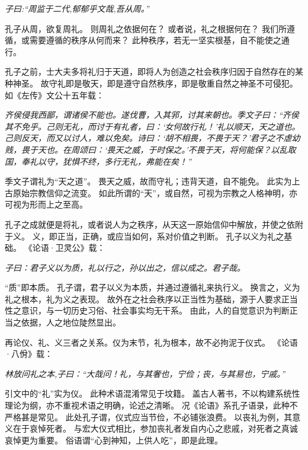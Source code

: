 \documentclass[11pt]{article}
\begin{document}
\textit{子曰:“周监于二代,郁郁乎文哉,吾从周。”}

孔子从周，欲复周礼。
则周礼之依据何在？
或者说，礼之根据何在？
我们所遵循，或需要遵循的秩序从何而来？
此种秩序，若无一坚实根基，自不能使之通行。

\par

孔子之前，士大夫多将礼归于天道，即将人为创造之社会秩序归因于自然存在的某种神圣。
故守礼即是敬天，即是遵守自然秩序，即是敬重自然之神圣不可侵犯。
如《左传》文公十五年载：

\textit{齐侯侵我西鄙，谓诸侯不能也。遂伐曹，入其郛，讨其来朝也。季文子曰：“齐侯其不免乎。己则无礼，而讨于有礼者，曰：‘女何故行礼！’礼以顺天，天之道也。己则反天，而又以讨人，难以免矣。诗曰：‘胡不相畏，不畏于天？’君子之不虐幼贱，畏于天也。在周颂曰：‘畏天之威，于时保之。’不畏于天，将何能保？以乱取国，奉礼以守，犹惧不终，多行无礼，弗能在矣！”}

季文子谓礼为“天之道”。
畏天之威，故而守礼；违背天道，自不能免。
此实为上古原始宗教信仰之流变。
如此所谓的“天”，或自然，可视为宗教之人格神明，亦可视为形而上之至高。

\par

孔子之成就便是将礼，或者说人为之秩序，从天这一原始信仰中解放，并使之依附于义。
义，即正当，正确，或应当如何，系对价值之判断。
孔子以义为礼之基础。
《论语·卫灵公》载：

\textit{子曰：君子义以为质，礼以行之，孙以出之，信以成之。君子哉。}

“质”即本质。
孔子谓，君子以义为本质，并通过遵循礼来执行义。
换言之，义为礼之根本，礼为义之表现。
故外在之社会秩序以正当性为基础，源于人要求正当性之意识，与一切历史习俗、社会事实均无干系。
由此，人的自觉意识为判断正当之依据，人之地位陡然显出。

\par

再论仪、礼、义三者之关系。仪为末节，礼为根本，故不必拘泥于仪式。
《论语·八佾》载：

\textit{林放问礼之本,子曰：“大哉问！礼，与其奢也，宁俭；丧，与其易也，宁戚。”}

引文中的“礼”实为仪。
此种术语混淆常见于坟籍。
盖古人著书，不以构建系统性理论为纲，亦不重视术语之明确，论述之清晰。
况《论语》系孔子语录，此种不严格甚是常见。
此处孔子谓，仪式应当节俭，不必铺张浪费。
以丧礼为例，其意义在于哀悼死者。
与宏大仪式相比，参加丧礼者发自内心之悲戚，对死者之真诚哀悼更为重要。
俗语谓“心到神知，上供人吃”，即是此理。

\par
\end{document}
